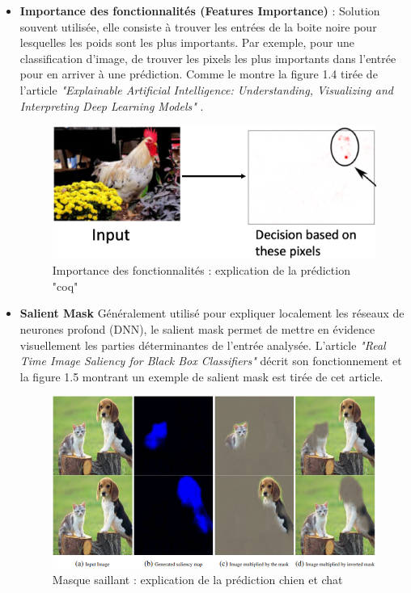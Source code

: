 \begin{itemize}
    \item \textbf{Importance des fonctionnalités (Features Importance)} : Solution souvent utilisée, elle consiste à trouver les entrées de la boite noire pour lesquelles les poids sont les plus importants. Par exemple, pour une classification d'image, de trouver les pixels les plus importants dans l'entrée pour en arriver à une prédiction. Comme le montre la figure 1.4 tirée de l'article \textit{"Explainable Artificial Intelligence: Understanding, Visualizing and Interpreting Deep Learning Models"} \cite{explainingIA}.\\
    \begin{figure}[h]
        \centering
        \includegraphics[scale=0.35]{src_img/chickenPixel.png}
        \caption{Importance des fonctionnalités : explication de la prédiction "coq"}
        \label{chickenPixel}
    \end{figure}
    
    \item \textbf{Salient Mask} Généralement utilisé pour expliquer localement les réseaux de neurones profond (DNN), le salient mask permet de mettre en évidence visuellement les parties déterminantes de l'entrée analysée. L'article \textit{"Real Time Image Saliency for Black Box Classifiers"}\cite{silentMask} décrit son fonctionnement et la figure 1.5 montrant un exemple de salient mask est tirée de cet article.
    \begin{figure}[h]
        \centering
        \includegraphics[scale=0.85]{src_img/silentMaskExemple.PNG}
        \caption{Masque saillant : explication de la prédiction chien et chat}
        \label{silentMaskExemple}
    \end{figure}
    

\end{itemize}
